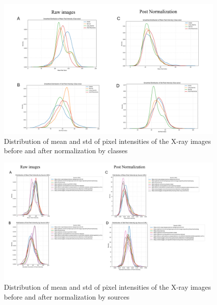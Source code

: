 \documentclass{article}
\begin{document}
\begin{figure} %
    \centering
    \includegraphics[width=1.0\linewidth]{Screenshot 2025-04-21 223200.png}
    \caption{Distribution of mean and std of pixel intensities of the X-ray images before and after normalization by classes}
    \label{fig:KDE_pre_post_normalization_class}
\end{figure}

\begin{figure} %
    \centering
    \includegraphics[width=1.0\linewidth]{Screenshot 2025-04-21 223207.png}
    \caption{Distribution of mean and std of pixel intensities of the X-ray images before and after normalization by sources}
    \label{fig:KDE_pre_post_normalization_URL}
\end{figure}

\newpage

\end{document}
